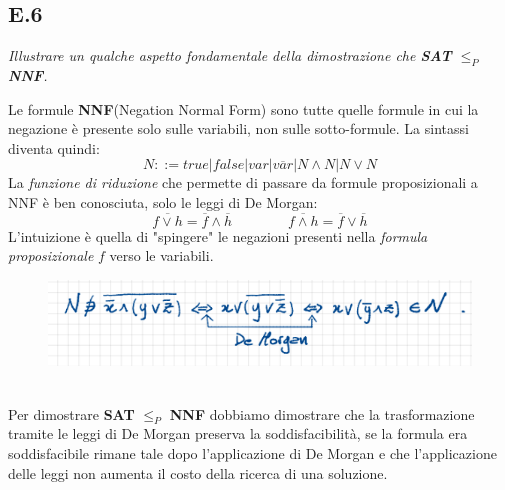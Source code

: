 \documentclass[a4paper]{article}
\begin{document}
\subsection{E.6}
\emph{Illustrare un qualche aspetto fondamentale della dimostrazione che \textbf{SAT} $\leq_P$ \textbf{NNF}.}


Le formule \textbf{NNF}(Negation Normal Form) sono tutte quelle formule in cui la negazione è presente solo sulle variabili, non sulle sotto-formule.
La sintassi diventa quindi:
$$ N ::= true|false|var|\overline{var}|N \land N|N \lor N$$
La \textit{funzione di riduzione} che permette di passare da formule proposizionali a NNF è ben conosciuta, solo le leggi di De Morgan:
$$ \overline{f \lor h} = \overline{f} \land \overline{h} \qquad \qquad \overline{f \land h} = \overline{f} \lor \overline{h}$$
L'intuizione è quella di "spingere" le negazioni presenti nella \textit{formula proposizionale} $f$ verso le variabili.\\
\begin{figure}[!ht]
                \centering
                \includegraphics[width = 1\textwidth]{./img/E6.png}
\end{figure}\\
Per dimostrare \textbf{SAT} $\leq_P$ \textbf{NNF} dobbiamo dimostrare che la trasformazione tramite le leggi di De Morgan preserva la soddisfacibilità, se la formula era soddisfacibile rimane tale dopo l'applicazione di De Morgan e che l'applicazione delle leggi non aumenta il costo della ricerca di una soluzione.\\
\end{document}

